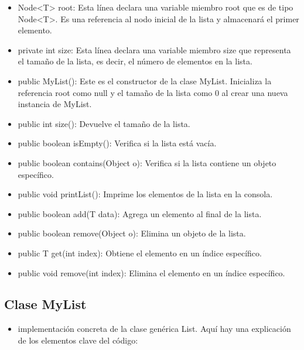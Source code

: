 \documentclass{article}
\begin{document}
	\begin{itemize}	
	\item Node<T> root: Esta línea declara una variable miembro root que es de tipo Node<T>. Es una referencia al nodo inicial de la lista y almacenará el primer elemento.

	\item private int size: Esta línea declara una variable miembro size que representa el tamaño de la lista, es decir, el número de elementos en la lista.

	\item public MyList(): Este es el constructor de la clase MyList. Inicializa la referencia root como null y el tamaño de la lista como 0 al crear una nueva instancia de MyList.

	\item public int size(): Devuelve el tamaño de la lista.

	\item public boolean isEmpty(): Verifica si la lista está vacía.

	\item public boolean contains(Object o): Verifica si la lista contiene un objeto específico.

	\item public void printList(): Imprime los elementos de la lista en la consola.

	\item public boolean add(T data): Agrega un elemento al final de la lista.

	\item public boolean remove(Object o): Elimina un objeto de la lista.

	\item public T get(int index): Obtiene el elemento en un índice específico.

	\item public void remove(int index): Elimina el elemento en un índice específico.

	\end{itemize}

	\subsection{Clase MyList}
	\begin{itemize}	
		\item  implementación concreta de la clase genérica List. Aquí hay una explicación de los elementos clave del código:
	\end{itemize}	
	
\end{document}

